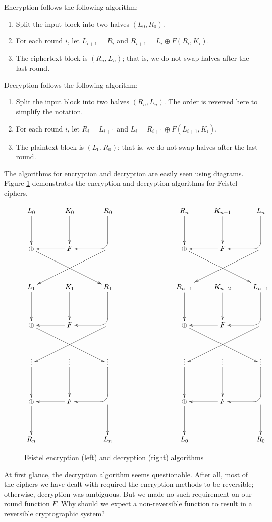 \documentclass{book}
\theoremstyle{plain}
\theoremstyle{definition}
\begin{document}
Encryption follows the following algorithm:
\begin{enumerate}
\item Split the input block into two halves $(L_0,R_0)$.
\item For each round $i$, let $L_{i+1} = R_i$ and $R_{i+1} = L_i \oplus F(R_i,K_i)$.
\item The ciphertext block is $(R_n,L_n)$; that is, we do not swap halves after the last round.
\end{enumerate}

Decryption follows the following algorithm:
\begin{enumerate}
\item Split the input block into two halves $(R_n,L_n)$. The order is reversed here to simplify the notation.
\item For each round $i$, let $R_i = L_{i+1}$ and $L_i = R_{i+1} \oplus F(L_{i+1},K_i)$.
\item The plaintext block is $(L_0,R_0)$; that is, we do not swap halves after the last round.
\end{enumerate}

The algorithms for encryption and decryption are easily seen using diagrams. Figure \ref{fig:feistel} demonstrates the encryption and decryption algorithms for Feistel ciphers.

\begin{figure}[h]
\begin{center}
$$\xymatrix@!{
L_0 \ar[d] & K_0 \ar[d] & R_0 \ar`d[dl][dl] & & R_n \ar[d] & K_{n-1} \ar[d] & L_n \ar`d[dl][dl] \\
\oplus \ar[drr] & F \ar[l] & \ar[dll] & & \oplus \ar[drr] & F \ar[l] & \ar[dll] \\
L_1 \ar[d] & K_1 \ar[d] & R_1 \ar`d[dl][dl] & & R_{n-1} \ar[d] & K_{n-2} \ar[d] & L_{n-1} \ar`d[dl][dl] \\
\oplus \ar[drr] & F \ar[l] & \ar[dll] & & \oplus \ar[drr] & F \ar[l] & \ar[dll] \\
\vdots \ar[d] & \vdots \ar[d] & \vdots \ar`d[dl][dl] & & \vdots \ar[d] & \vdots \ar[d] & \vdots \ar`d[dl][dl] \\
\oplus \ar[d] & F \ar[l] & \ar[d] & & \oplus \ar[d] & F \ar[l] & \ar[d] \\
R_n & & L_n & & L_0 & & R_0
}$$
\end{center}
\caption{Feistel encryption (left) and decryption (right) algorithms}
\label{fig:feistel}
\end{figure}

At first glance, the decryption algorithm seems questionable. After all, most of the ciphers we have dealt with required the encryption methods to be reversible; otherwise, decryption was ambiguous. But we made no such requirement on our round function $F$. Why should we expect a non-reversible function to result in a reversible cryptographic system?
\end{document}
